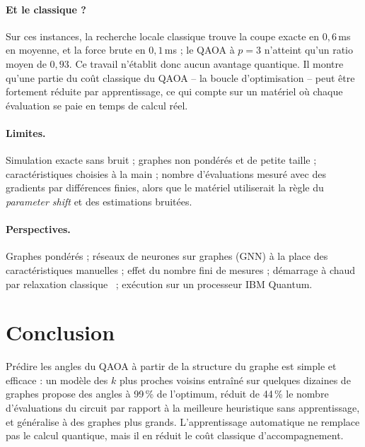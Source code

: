 \documentclass[11pt,a4paper]{article}
\begin{document}
\paragraph{Et le classique ?}
Sur ces instances, la recherche locale classique trouve la coupe exacte en $0{,}6$\,ms en moyenne, et
la force brute en $0{,}1$\,ms ; le QAOA à $p=3$ n'atteint qu'un ratio moyen de $0{,}93$. Ce travail
n'établit donc aucun avantage quantique. Il montre qu'une partie du coût classique du QAOA -- la boucle
d'optimisation -- peut être fortement réduite par apprentissage, ce qui compte sur un matériel où chaque
évaluation se paie en temps de calcul réel.

\paragraph{Limites.}
Simulation exacte sans bruit ; graphes non pondérés et de petite taille ; caractéristiques choisies à la
main ; nombre d'évaluations mesuré avec des gradients par différences finies, alors que le matériel
utiliserait la règle du \emph{parameter shift} et des estimations bruitées.

\paragraph{Perspectives.}
Graphes pondérés ; réseaux de neurones sur graphes (GNN) à la place des caractéristiques manuelles ;
effet du nombre fini de mesures ; démarrage à chaud par relaxation classique~\cite{egger2021} ;
exécution sur un processeur IBM Quantum.

\section{Conclusion}

Prédire les angles du QAOA à partir de la structure du graphe est simple et efficace : un modèle des
$k$ plus proches voisins entraîné sur quelques dizaines de graphes propose des angles à 99\,\% de
l'optimum, réduit de 44\,\% le nombre d'évaluations du circuit par rapport à la meilleure heuristique
sans apprentissage, et généralise à des graphes plus grands. L'apprentissage automatique ne remplace
pas le calcul quantique, mais il en réduit le coût classique d'accompagnement.
\end{document}
